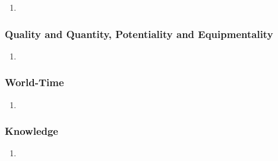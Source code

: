 \begin{enumerate}
  \item
\end{enumerate}

\subsubsection{Quality and Quantity, Potentiality and Equipmentality}

\begin{enumerate}
  \item
\end{enumerate}

\subsubsection{World-Time}

\begin{enumerate}
  \item
\end{enumerate}

\subsubsection{Knowledge}

\begin{enumerate}
  \item
\end{enumerate}
